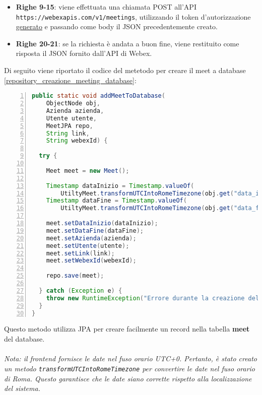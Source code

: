 \begin{itemize}
    \item \textbf{Righe 9-15}: viene effettuata una chiamata POST all'API 
    \\ \texttt{https://webexapis.com/v1/meetings}, utilizzando il token d'autorizzazione \hyperref[sec:recupero_access_token]{generato} 
    e passando come body il JSON precedentemente creato.

    \item \textbf{Righe 20-21}: se la richiesta è andata a buon fine, viene restituito come risposta il JSON fornito dall'API di Webex.
    
\end{itemize}
Di seguito viene riportato il codice del metetodo per creare il meet a database \ref{repository_creazione_meeting_database}:
\begin{lstlisting}[language=java, frame=lines, basicstyle=\ttfamily\scriptsize, numbers=left, 
    label={repository_creazione_meeting_database}, caption={repository creazione meeting - Database}]
public static void addMeetToDatabase(
    ObjectNode obj, 
    Azienda azienda, 
    Utente utente, 
    MeetJPA repo, 
    String link,
    String webexId) {

  try {
    
    Meet meet = new Meet();
  
    Timestamp dataInizio = Timestamp.valueOf(
        UtiltyMeet.transformUTCIntoRomeTimezone(obj.get("data_inizio").asText()));
    Timestamp dataFine = Timestamp.valueOf(
        UtiltyMeet.transformUTCIntoRomeTimezone(obj.get("data_fine").asText()));

    meet.setDataInizio(dataInizio);
    meet.setDataFine(dataFine);
    meet.setAzienda(azienda);
    meet.setUtente(utente);
    meet.setLink(link);
    meet.setWebexId(webexId);

    repo.save(meet);

  } catch (Exception e) {
    throw new RuntimeException("Errore durante la creazione del meeting al database", e);
  }
}
\end{lstlisting}
Questo metodo utilizza JPA per creare facilmente un record nella tabella \textbf{meet} del database.
\\
\\
\textit{Nota: il frontend fornisce le date nel fuso orario UTC+0. Pertanto, è stato creato 
un metodo \texttt{transformUTCIntoRomeTimezone} per convertire le date nel fuso orario di Roma. 
Questo garantisce che le date siano corrette rispetto alla localizzazione del sistema.}